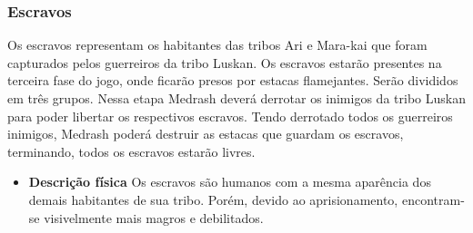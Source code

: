 \subsubsection{Escravos}
Os escravos representam os habitantes das tribos Ari e Mara-kai que foram capturados pelos guerreiros da tribo Luskan. Os escravos estarão presentes na terceira fase do jogo, onde ficarão presos por estacas flamejantes. Serão divididos em três grupos. Nessa etapa Medrash deverá derrotar os inimigos da tribo Luskan para poder libertar os respectivos escravos. Tendo derrotado todos os guerreiros inimigos, Medrash poderá destruir as estacas que guardam os escravos, terminando, todos os escravos estarão livres.

\begin{itemize}
\item{\bf Descrição física}
Os escravos são humanos com a mesma aparência dos demais habitantes de sua tribo. Porém, devido ao aprisionamento, encontram-se visivelmente mais magros e debilitados.
\end{itemize}
